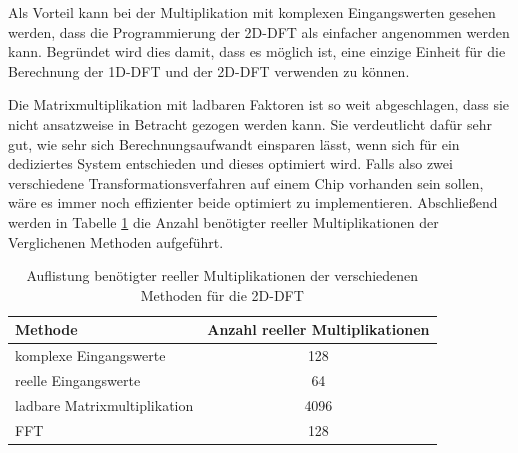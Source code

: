 Als Vorteil kann bei der Multiplikation mit komplexen Eingangswerten gesehen werden, dass die Programmierung der 2D-DFT als einfacher angenommen werden kann.
Begründet wird dies damit, dass es möglich ist, eine einzige Einheit für die Berechnung der 1D-DFT und der 2D-DFT verwenden zu können.

Die Matrixmultiplikation mit ladbaren Faktoren ist so weit abgeschlagen, dass sie nicht ansatzweise in Betracht gezogen werden kann. Sie verdeutlicht
dafür sehr gut, wie sehr sich Berechnungsaufwandt einsparen lässt, wenn sich für ein dediziertes System entschieden und dieses optimiert wird.
Falls also zwei verschiedene Transformationsverfahren auf einem Chip vorhanden sein sollen, wäre es immer noch effizienter beide optimiert zu implementieren.
Abschließend werden in Tabelle \ref{tab:AuflistungMultiplikationen} die Anzahl benötigter reeller Multiplikationen der Verglichenen Methoden aufgeführt.


\begin{table}[ht!]
\centering
\caption{Auflistung benötigter reeller Multiplikationen der verschiedenen Methoden für die 2D-DFT}
 \begin{tabular}{lc}
  \hline
  Methode  & Anzahl reeller Multiplikationen\\
  \hline
  komplexe Eingangswerte & 128\\
  reelle Eingangswerte   & 64\\
  ladbare Matrixmultiplikation & 4096\\
  FFT   & 128\\
  \hline
 \end{tabular}
 \label{tab:AuflistungMultiplikationen}
\end{table}
